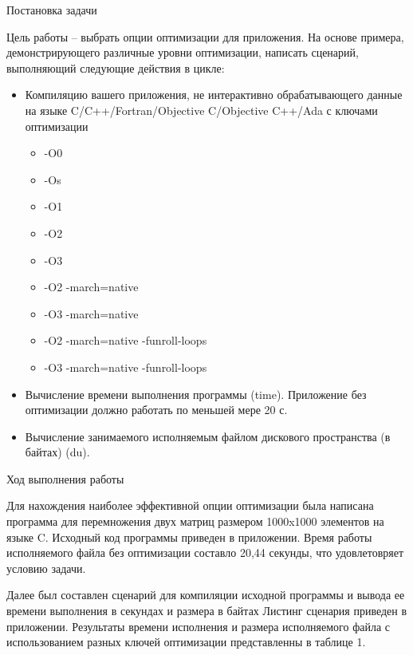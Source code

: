\documentclass[12pt,a4paper]{scrartcl}
\begin{document}
\newpage
\begin{center}
    {\LARGE Постановка задачи}
\end{center}
\par
Цель работы -- выбрать опции оптимизации для приложения.
На основе примера, демонстрирующего различные уровни оптимизации, написать
сценарий, выполняющий следующие действия в цикле:
\begin{itemize}
  \item Компиляцию вашего приложения, не интерактивно обрабатывающего
данные на языке C/C++/Fortran/Objective C/Objective C++/Ada с ключами
оптимизации
\begin{itemize}
  \item -O0
  \item -Os
  \item -O1
  \item -O2
  \item -O3
  \item -O2 -march=native
  \item -O3 -march=native
  \item -O2 -march=native -funroll-loops
  \item -O3 -march=native -funroll-loops
\end{itemize}
\item Вычисление времени выполнения программы (time). Приложение без
оптимизации должно работать по меньшей мере 20 с.
\item Вычисление занимаемого исполняемым файлом дискового пространства (в
байтах) (du).
\end{itemize}

\newpage
\begin{center}
    {\LARGE Ход выполнения работы}
\end{center}
\par
Для нахождения наиболее эффективной опции оптимизации была написана программа
для перемножения двух матриц размером 1000x1000 элементов на языке C.
Исходный код программы приведен в приложении. Время работы исполняемого файла без оптимизации составло 20,44 секунды, что удовлетовряет условию задачи.
\par
Далее был составлен сценарий для компиляции исходной программы и вывода ее времени выполнения в секундах и размера в байтах
Листинг сценария приведен в приложении. Результаты времени исполнения и размера исполняемого файла с использованием разных ключей оптимизации представленны в таблице 1.
\end{document}

